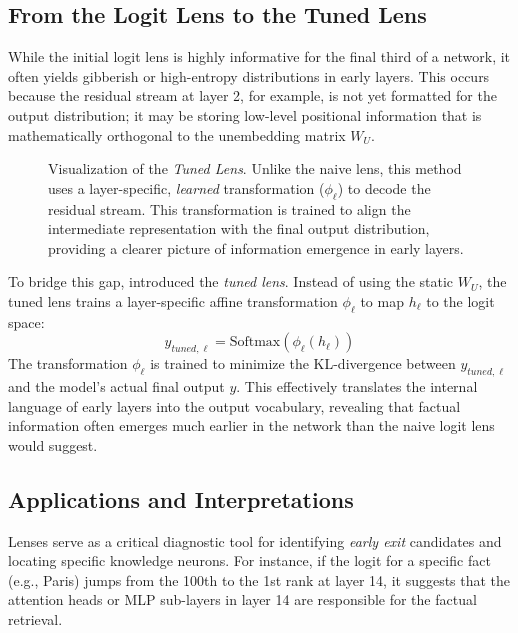 \subsection{From the Logit Lens to the Tuned Lens}
While the initial logit lens is highly informative for the final third of a network, it often yields gibberish or high-entropy distributions in early layers. This occurs because the residual stream at layer 2, for example, is not yet formatted for the output distribution; it may be storing low-level positional information that is mathematically orthogonal to the unembedding matrix $W_U$.

\begin{figure}[htbp]
    \centering
    \resizebox{0.65\textwidth}{!}{
        
    }
    \caption{Visualization of the \textit{Tuned Lens}. Unlike the naive lens, this method uses a layer-specific, \emph{learned} transformation ($\phi_\ell$) to decode the residual stream. This transformation is trained to align the intermediate representation with the final output distribution, providing a clearer picture of information emergence in early layers.}
    \label{fig:tuned_lens}
\end{figure}

To bridge this gap, \citet{belrose2023eliciting} introduced the \textit{tuned lens}. Instead of using the static $W_U$, the tuned lens trains a layer-specific affine transformation $\phi_\ell$ to map $h_\ell$ to the logit space:
\begin{equation}
    y_{tuned, \ell} = \text{Softmax}(\phi_\ell(h_\ell))
\end{equation}
The transformation $\phi_\ell$ is trained to minimize the KL-divergence between $y_{tuned, \ell}$ and the model's actual final output $y$. This effectively translates the internal language of early layers into the output vocabulary, revealing that factual information often emerges much earlier in the network than the naive logit lens would suggest.

\subsection{Applications and Interpretations}
Lenses serve as a critical diagnostic tool for identifying \emph{early exit} candidates and locating specific knowledge neurons. For instance, if the logit for a specific fact (e.g., Paris) jumps from the 100th to the 1st rank at layer 14, it suggests that the attention heads or MLP sub-layers in layer 14 are responsible for the factual retrieval. 

